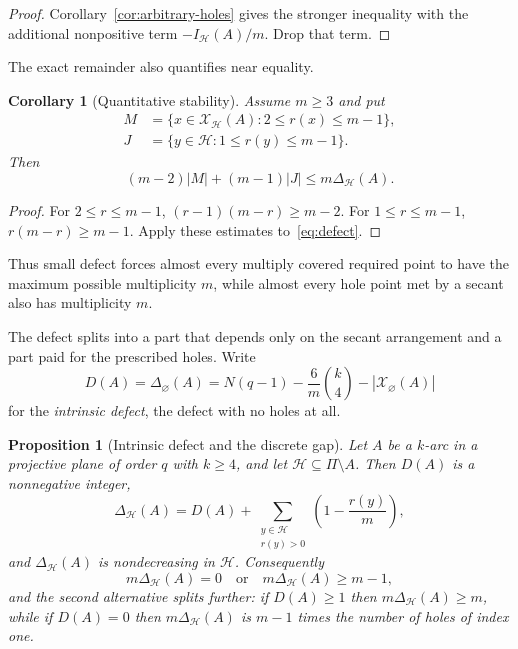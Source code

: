 \documentclass[11pt]{article}
\newtheorem{proposition}[theorem]{Proposition}
\newtheorem{corollary}[theorem]{Corollary}
\theoremstyle{definition}
\theoremstyle{remark}
\newcommand{\cH}{\mathcal{H}}
\newcommand{\cX}{\mathcal{X}}
\newcommand{\IH}{I_{\cH}}
\begin{document}
\begin{proof}
Corollary~\ref{cor:arbitrary-holes} gives the stronger inequality with the
additional nonpositive term \(-\IH(A)/m\).  Drop that term.
\end{proof}

The exact remainder also quantifies near equality.

\begin{corollary}[Quantitative stability]
\label{cor:stability}
Assume $m\ge3$ and put
\begin{align*}
 M&=\{x\in\cX_{\cH}(A):2\le r(x)\le m-1\},\\
 J&=\{y\in\cH:1\le r(y)\le m-1\}.
\end{align*}
Then
\begin{equation}
 (m-2)|M|+(m-1)|J|\le m\Delta_{\cH}(A).
\label{eq:stability}
\end{equation}
\end{corollary}

\begin{proof}
For $2\le r\le m-1$,
$(r-1)(m-r)\ge m-2$.  For $1\le r\le m-1$,
$r(m-r)\ge m-1$.  Apply these estimates to~\eqref{eq:defect}.
\end{proof}

Thus small defect forces almost every multiply covered required point to
have the maximum possible multiplicity $m$, while almost every hole point
met by a secant also has multiplicity $m$.

The defect splits into a part that depends only on the secant arrangement
and a part paid for the prescribed holes.  Write
\[
 D(A)=\Delta_{\varnothing}(A)
 =N(q-1)-\frac6m\binom{k}{4}-|\cX_{\varnothing}(A)|
\]
for the \emph{intrinsic defect}, the defect with no holes at all.

\begin{proposition}[Intrinsic defect and the discrete gap]
\label{prop:intrinsic-defect}
Let $A$ be a $k$-arc in a projective plane of order $q$ with $k\ge4$, and
let $\cH\subseteq\Pi\setminus A$.  Then $D(A)$ is a nonnegative integer,
\begin{equation}
 \Delta_{\cH}(A)=D(A)+\sum_{\substack{y\in\cH\\ r(y)>0}}
 \left(1-\frac{r(y)}m\right),
\label{eq:intrinsic-split}
\end{equation}
and $\Delta_{\cH}(A)$ is nondecreasing in $\cH$.  Consequently
\begin{equation}
 m\Delta_{\cH}(A)=0
 \quad\text{or}\quad
 m\Delta_{\cH}(A)\ge m-1,
\label{eq:gap}
\end{equation}
and the second alternative splits further: if $D(A)\ge1$ then
$m\Delta_{\cH}(A)\ge m$, while if $D(A)=0$ then $m\Delta_{\cH}(A)$ is
$m-1$ times the number of holes of index one.
\end{proposition}
\end{document}
